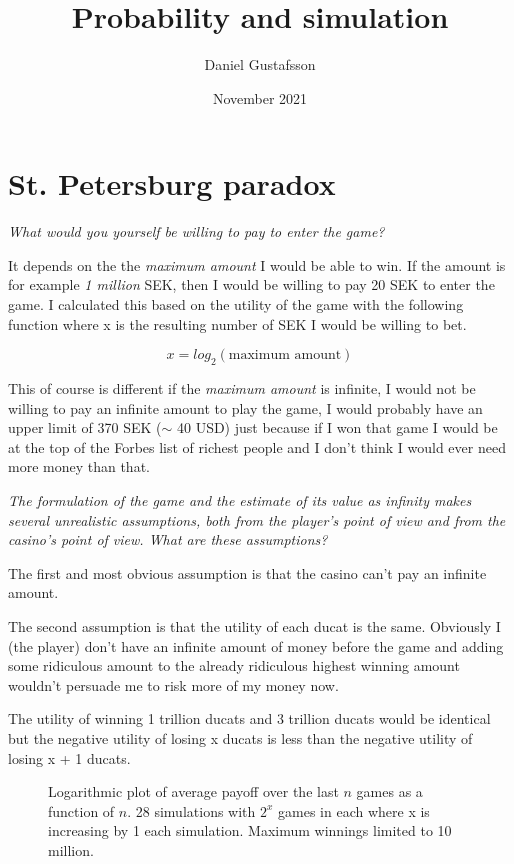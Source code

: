 \documentclass[11pt, a4paper]{article}
\title{Probability and simulation}
\author{Daniel Gustafsson}
\date{November 2021}
\begin{document}
\maketitle

\section{St. Petersburg paradox}

\textit{What would you yourself be willing to pay to enter the game?}

\vspace{2mm}\noindent
It depends on the the \textit{maximum amount} I would be able to win.
If the amount is for example \textit{1 million} SEK, then I would be willing to pay 20 SEK to enter the game.
I calculated this based on the utility of the game with the following function where x is the resulting
number of SEK I would be willing to bet.

\[x = log_2(\text{maximum amount})\]

This of course is different if the \textit{maximum amount} is infinite, I would not be willing to pay an infinite
amount to play the game, I would probably have an upper limit of 370 SEK ($\sim$ 40 USD) just because if I won that game I would
be at the top of the Forbes list of richest people and I don't think I would ever need more money than that.

\textit{The formulation of the game and the estimate of its value as infinity makes several unrealistic assumptions,
both from the player's point of view and from the casino's point of view. What are these assumptions?}

\vspace{2mm}\noindent
The first and most obvious assumption is that the casino can't pay an infinite amount.

\vspace{1mm}\noindent
The second assumption is that the utility of each ducat is the same. Obviously I (the player) don't have
an infinite amount of money before the game and adding some ridiculous amount to the already ridiculous highest winning amount
wouldn't persuade me to risk more of my money now. 

The utility of winning 1 trillion ducats and 3 trillion ducats would be identical but the negative utility of losing x ducats is less
than the negative utility of losing x + 1 ducats.

\begin{figure}[ht]
	\label{fig:st_petersburg}
	\centering
	\caption{Logarithmic plot of average payoff over the last $n$ games as a function of $n$. 28 simulations with $2^x$ games in each 
	where x is increasing by 1 each simulation.
	Maximum winnings limited to 10 million.}
	\scriptsize
	
\end{figure}
\end{document}

